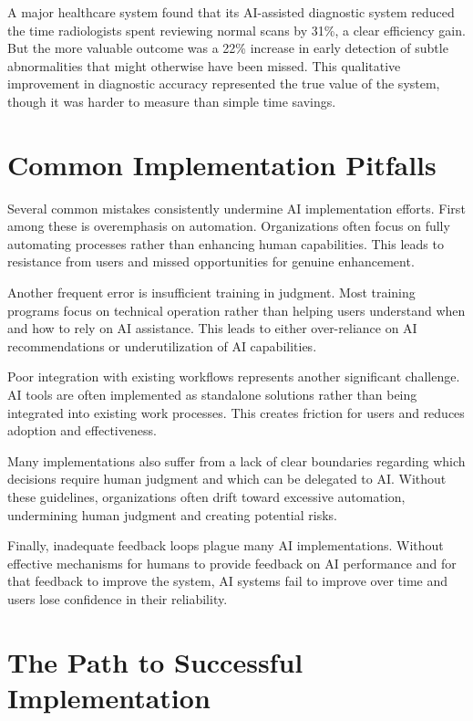 \documentclass[
  Letterpaper,
]{scrbook}
\begin{document}
A major healthcare system found that its AI-assisted diagnostic system
reduced the time radiologists spent reviewing normal scans by 31\%, a
clear efficiency gain. But the more valuable outcome was a 22\% increase
in early detection of subtle abnormalities that might otherwise have
been missed. This qualitative improvement in diagnostic accuracy
represented the true value of the system, though it was harder to
measure than simple time savings.

\section{Common Implementation
Pitfalls}\label{common-implementation-pitfalls}

Several common mistakes consistently undermine AI implementation
efforts. First among these is overemphasis on automation. Organizations
often focus on fully automating processes rather than enhancing human
capabilities. This leads to resistance from users and missed
opportunities for genuine enhancement.

Another frequent error is insufficient training in judgment. Most
training programs focus on technical operation rather than helping users
understand when and how to rely on AI assistance. This leads to either
over-reliance on AI recommendations or underutilization of AI
capabilities.

Poor integration with existing workflows represents another significant
challenge. AI tools are often implemented as standalone solutions rather
than being integrated into existing work processes. This creates
friction for users and reduces adoption and effectiveness.

Many implementations also suffer from a lack of clear boundaries
regarding which decisions require human judgment and which can be
delegated to AI. Without these guidelines, organizations often drift
toward excessive automation, undermining human judgment and creating
potential risks.

Finally, inadequate feedback loops plague many AI implementations.
Without effective mechanisms for humans to provide feedback on AI
performance and for that feedback to improve the system, AI systems fail
to improve over time and users lose confidence in their reliability.

\section{The Path to Successful
Implementation}\label{the-path-to-successful-implementation}
\end{document}
